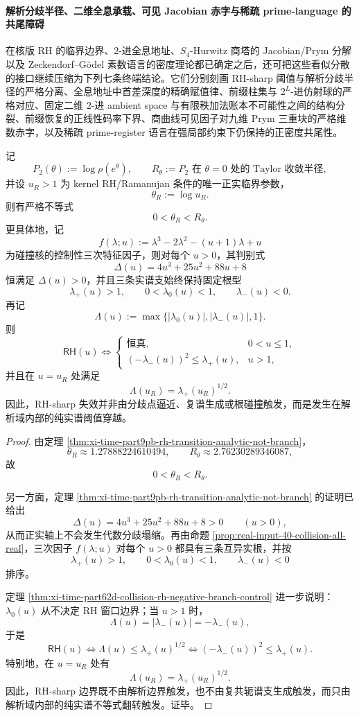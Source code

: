 \paragraph{解析分歧半径、二维全息承载、可见 Jacobian 赤字与稀疏 prime-language 的共尾障碍}
在核版 RH 的临界边界、\(2\)-进全息地址、\(S_4\)-Hurwitz 商塔的 Jacobian/Prym 分解以及 Zeckendorf--G\"odel 素数语言的密度理论都已确定之后，还可把这些看似分散的接口继续压缩为下列七条终端结论。它们分别刻画 RH-sharp 阈值与解析分歧半径的严格分离、全息地址中首差深度的精确赋值律、前缀柱集与 \(2^L\)-进仿射球的严格对应、固定二维 \(2\)-进 ambient space 与有限秩加法账本不可能性之间的结构分裂、前缀恢复的正线性码率下界、商曲线可见因子对九维 Prym 三重块的严格维数赤字，以及稀疏 prime-register 语言在强局部约束下仍保持的正密度共尾性。

\begin{theorem}\label{thm:xi-time-part9w-analytic-branch-radius-rhsharp-separation}
记
\[
P_2(\theta):=\log \rho(e^\theta),
\qquad
R_\theta:=\text{\(P_2\) 在 \(\theta=0\) 处的 Taylor 收敛半径},
\]
并设 \(u_R>1\) 为 kernel RH/Ramanujan 条件的唯一正实临界参数，
\[
\theta_R:=\log u_R.
\]
则有严格不等式
\[
0<\theta_R<R_\theta.
\]
更具体地，记
\[
f(\lambda;u):=\lambda^3-2\lambda^2-(u+1)\lambda+u
\]
为碰撞核的控制性三次特征因子，则对每个 \(u>0\)，其判别式
\[
\Delta(u)=4u^3+25u^2+88u+8
\]
恒满足 \(\Delta(u)>0\)，并且三条实谱支始终保持固定根型
\[
\lambda_+(u)>1,\qquad 0<\lambda_0(u)<1,\qquad \lambda_-(u)<0.
\]
再记
\[
\Lambda(u):=\max\{|\lambda_0(u)|,|\lambda_-(u)|,1\}.
\]
则
\[
\textsf{RH}(u)\iff
\begin{cases}
\text{恒真},& 0<u\le 1,\\[1mm]
(-\lambda_-(u))^2\le \lambda_+(u),& u>1,
\end{cases}
\]
并且在 \(u=u_R\) 处满足
\[
\Lambda(u_R)=\lambda_+(u_R)^{1/2}.
\]
因此，RH-sharp 失效并非由分歧点逼近、复谱生成或根碰撞触发，而是发生在解析域内部的纯实谱阈值穿越。
\end{theorem}
\begin{proof}
由定理 \ref{thm:xi-time-part9pb-rh-transition-analytic-not-branch}，
\[
\theta_R\approx 1.27888224610494,
\qquad
R_\theta\approx 2.76230289346087,
\]
故
\[
0<\theta_R<R_\theta.
\]

另一方面，定理 \ref{thm:xi-time-part9pb-rh-transition-analytic-not-branch} 的证明已给出
\[
\Delta(u)=4u^3+25u^2+88u+8>0
\qquad (u>0),
\]
从而正实轴上不会发生代数分歧塌缩。再由命题
\ref{prop:real-input-40-collision-all-real}，三次因子 \(f(\lambda;u)\) 对每个 \(u>0\) 都具有三条互异实根，并按
\[
\lambda_+(u)>1,\qquad 0<\lambda_0(u)<1,\qquad \lambda_-(u)<0
\]
排序。

定理 \ref{thm:xi-time-part62d-collision-rh-negative-branch-control} 进一步说明：\(\lambda_0(u)\) 从不决定 RH 窗口边界；当 \(u>1\) 时，
\[
\Lambda(u)=|\lambda_-(u)|=-\lambda_-(u),
\]
于是
\[
\textsf{RH}(u)\iff \Lambda(u)\le \lambda_+(u)^{1/2}
\iff
(-\lambda_-(u))^2\le \lambda_+(u).
\]
特别地，在 \(u=u_R\) 处有
\[
\Lambda(u_R)=\lambda_+(u_R)^{1/2}.
\]
因此，RH-sharp 边界既不由解析边界触发，也不由复共轭谱支生成触发，而只由解析域内部的纯实谱不等式翻转触发。证毕。
\end{proof}

